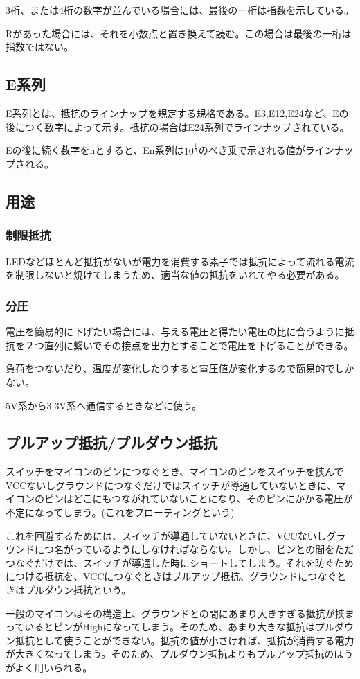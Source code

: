 \documentclass[a4paper,titlepage,here]{ujarticle}
\begin{document}
3桁、または4桁の数字が並んでいる場合には、最後の一桁は指数を示している。

Rがあった場合には、それを小数点と置き換えて読む。この場合は最後の一桁は指数ではない。
\subsection{E系列}
E系列とは、抵抗のラインナップを規定する規格である。E3,E12,E24など、Eの後につく数字によって示す。抵抗の場合はE24系列でラインナップされている。

Eの後に続く数字をnとすると、En系列は$10^{\frac{1}{n}}$のべき乗で示される値がラインナップされる。
\subsection{用途}
\subsubsection{制限抵抗}
LEDなどほとんど抵抗がないが電力を消費する素子では抵抗によって流れる電流を制限しないと焼けてしまうため、適当な値の抵抗をいれてやる必要がある。
\subsubsection{分圧}
電圧を簡易的に下げたい場合には、与える電圧と得たい電圧の比に合うように抵抗を２つ直列に繋いでその接点を出力とすることで電圧を下げることができる。

負荷をつないだり、温度が変化したりすると電圧値が変化するので簡易的でしかない。

5V系から3.3V系へ通信するときなどに使う。
\subsection{プルアップ抵抗/プルダウン抵抗}
スイッチをマイコンのピンにつなぐとき、マイコンのピンをスイッチを挟んでVCCないしグラウンドにつなぐだけではスイッチが導通していないときに、マイコンのピンはどこにもつながれていないことになり、そのピンにかかる電圧が不定になってしまう。(これをフローティングという)

これを回避するためには、スイッチが導通していないときに、VCCないしグラウンドにつ名がっているようにしなければならない。しかし、ピンとの間をただつなぐだけでは、スイッチが導通した時にショートしてしまう。それを防ぐためにつける抵抗を、VCCにつなぐときはプルアップ抵抗、グラウンドにつなぐときはプルダウン抵抗という。

一般のマイコンはその構造上、グラウンドとの間にあまり大きすぎる抵抗が挟まっているとピンがHighになってしまう。そのため、あまり大きな抵抗はプルダウン抵抗として使うことができない。抵抗の値が小さければ、抵抗が消費する電力が大きくなってしまう。そのため、プルダウン抵抗よりもプルアップ抵抗のほうがよく用いられる。
\end{document}
